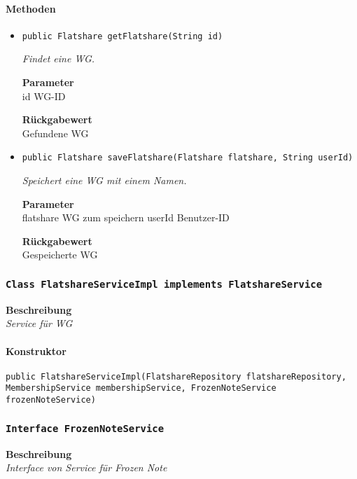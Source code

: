     \paragraph*{Methoden}
    \begin{itemize}
    	\item{\texttt{public Flatshare getFlatshare(String id)}}
    	
    	\textit{Findet eine WG.}
    	
    	\textbf{Parameter} \\
    	id WG-ID
    	
    	\textbf{Rückgabewert} \\
    	Gefundene WG        \item{\texttt{public Flatshare saveFlatshare(Flatshare flatshare, String userId)}}
    	
    	\textit{Speichert eine WG mit einem Namen.}
    	
    	\textbf{Parameter} \\
    	flatshare WG zum speichern
    	userId Benutzer-ID
    	
    	\textbf{Rückgabewert} \\
    	Gespeicherte WG
    \end{itemize}
    \subsubsection{\texttt{Class FlatshareServiceImpl implements FlatshareService}}
    \textbf{Beschreibung} \\
    \textit{Service für WG}
    \paragraph*{Konstruktor}
    \texttt{public FlatshareServiceImpl(FlatshareRepository flatshareRepository, MembershipService membershipService, FrozenNoteService frozenNoteService)}
    \subsubsection{\texttt{Interface FrozenNoteService}}
    \textbf{Beschreibung} \\
    \textit{Interface von Service für Frozen Note}
